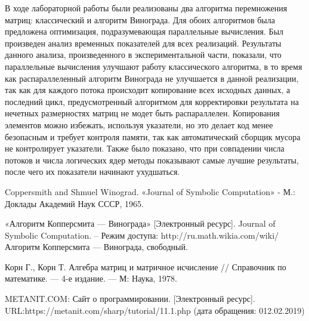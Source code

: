 \documentclass[12pt,a4paper]{scrartcl}
\begin{document}
В ходе лабораторной работы были реализованы два алгоритма перемножения матриц: классический и алгоритм Винограда.
Для обоих алгоритмов была предложена оптимизация, подразумевающая параллельные вычисления.
Был произведен анализ временных показателей для всех реализаций.
Результаты данного анализа, произведенного в экспериментальной части, показали, что параллельные вычисления улучшают работу классического алгоритма, в то время как распараллеленный алгоритм Винограда не улучшается в данной реализации, так как для каждого потока происходит копирование всех исходных данных, а последний цикл, предусмотренный алгоритмом для корректировки результата на нечетных размерностях матриц не модет быть распараллелен. Копирования элементов можно избежать, используя указатели, но это делает код менее безопасным и требует контроля памяти, так как автоматический сборщик мусора не контролирует указатели. 
Также было показано, что при совпадении числа потоков и числа логических ядер методы показывают самые лучшие результаты, после чего их показатели начинают ухудшаться.

    \newpage
    \begin{thebibliography}{9}
         Coppersmith and Shmuel Winograd. «Journal of Symbolic Computation» - М.:  Доклады Академий Наук СССР, 1965.

         «Алгоритм Копперсмита — Винограда» [Электронный ресурс]. Journal of Symbolic Computation. – Режим доступа:
        http://ru.math.wikia.com/wiki/Алгоритм Копперсмита — Винограда, свободный.	

         Корн Г., Корн Т. Алгебра матриц и матричное исчисление // Справочник по математике. — 4-е издание. — М: Наука, 1978. 
    
        \bibitem METANIT.COM: Сайт о программировании. [Электронный ресурс]. \\URL:https://metanit.com/sharp/tutorial/11.1.php (дата обращения: 012.02.2019)
    \end{thebibliography}
\end{document}
